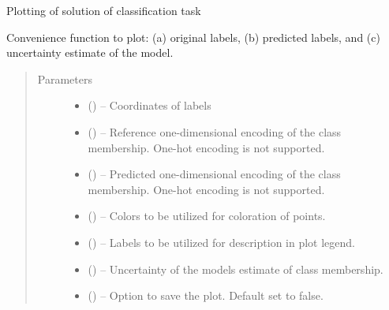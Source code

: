 \documentclass[a4paper,10pt,english]{sphinxmanual}
\begin{document}
\begin{fulllineitems}
\label{\detokenize{api/ucf.plot_solution:ucf.plot_solution}}
Plotting of solution of classification task

Convenience function to plot: (a) original labels, (b) predicted
labels, and (c) uncertainty estimate of the model.
\begin{quote}\begin{description}
\item[{Parameters}] \leavevmode\begin{itemize}
\item {} 
 () -- Coordinates of labels

\item {} 
 () -- Reference one-dimensional encoding of the class membership.
One-hot encoding is not supported.

\item {} 
 () -- Predicted one-dimensional encoding of the class membership.
One-hot encoding is not supported.

\item {} 
 () -- Colors to be utilized for coloration of points.

\item {} 
 () -- Labels to be utilized for description in plot legend.

\item {} 
 () -- Uncertainty of the models estimate of class membership.

\item {} 
 () -- Option to save the plot. Default set to false.


\end{itemize}
\end{description}
\end{quote}
\end{fulllineitems}
\end{document}
